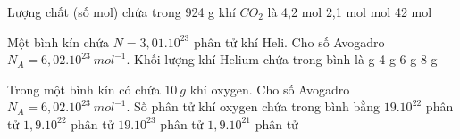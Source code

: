 \begin{vidu}%
	Lượng chất (số mol) chứa trong 924 g khí $CO_2$ là
	\choice
	{4,2 mol}
	{2,1 mol}
	{ mol}
	{42 mol}
\end{vidu}
\begin{vidu}%
	Một bình kín chứa $N=3,01.10^{23}$ phân tử khí Heli. Cho số Avogadro $N_A = 6,02.10^{23}\ mol^{-1}$. Khối lượng khí Helium chứa trong bình là
	\choice
	{ g}
	{4 g}
	{6 g}
	{8 g}
\end{vidu}

\begin{vidu}%
	Trong một bình kín có chứa $10\ g$ khí oxygen. Cho số Avogadro $N_A = 6,02.10^{23}\ mol^{-1}$. Số phân tử khí oxygen chứa trong bình bằng
	\choice
	{\True $19.10^{22}$ phân tử}
	{$1,9.10^{22}$ phân tử}
	{$19.10^{23}$ phân tử}
	{$1,9.10^{21}$ phân tử}
\end{vidu}

